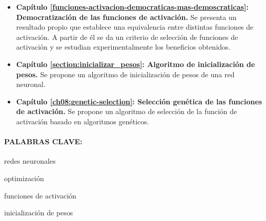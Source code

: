 \begin{itemize}
    \item \textbf{Capítulo \ref{funciones-activacion-democraticas-mas-demoscraticas}: Democratización de las funciones de activación.} Se presenta un resultado propio que establece una equivalencia entre distintas funciones de activación. A partir de él se da un criterio de selección de funciones de activación y se estudian experimentalmente los beneficios obtenidos. 
    \item \textbf{Capítulo \ref{section:inicializar_pesos}: Algoritmo de inicialización de pesos.} Se propone un algoritmo de inicialización de pesos de una red neuronal.
    \item \textbf{Capítulo \ref{ch08:genetic-selection}: Selección genética de las funciones de activación.} Se propone un algoritmo de selección de la función de activación basado en algoritmos genéticos. 
\end{itemize}

\paragraph{PALABRAS CLAVE:}
\begin{itemize*}[label=,itemsep=1em,itemjoin=\hspace{1em}]
  \item redes neuronales
  \item optimización 
  \item funciones de activación 
  \item inicialización de pesos
\end{itemize*}

\endinput
